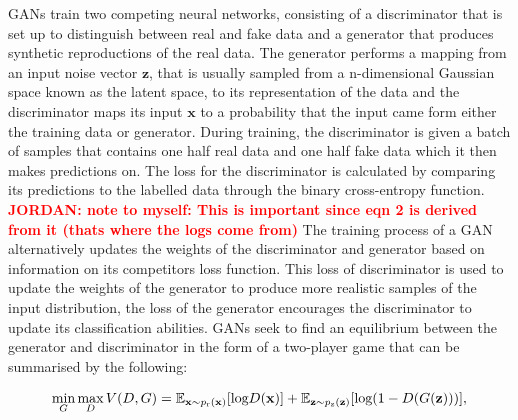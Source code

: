 \documentclass[12pt]{iopart}
\newcommand{\jordan}[1]{\textbf{\textcolor{red}{JORDAN: #1}}}
\newcommand{\chris}[1]{\textbf{\textcolor{green}{CHRIS: #1}}}
\begin{document}
%
\acp{GAN} train two competing neural networks, consisting of a discriminator
that is set up to distinguish between real and fake data and a generator that
produces synthetic reproductions of the real data. The generator performs a
mapping from an input noise vector $\mathbf{z}$, that is usually sampled from a n-dimensional Gaussian space known as the latent space, to its representation of the
data and the discriminator maps its input $\mathbf{x}$ to a probability that
the input came form either the training data or generator.  During training,
the discriminator is given a batch of samples that contains one half real data
and one half fake data which it then makes predictions on. The loss for the
discriminator is calculated by comparing its predictions to the labelled data
through the binary cross-entropy function. \jordan{note to myself: This is important since eqn 2 is derived from it (thats where the logs come from)} The training process of a \ac{GAN}
alternatively updates the weights of the discriminator and generator based on
information on its competitors loss function. This loss of discriminator is
used to update the weights of the generator to produce more realistic samples
of the input distribution, the loss of the generator encourages the
discriminator to update its classification abilities. GANs seek to find an equilibrium between the generator and discriminator in the form of a two-player game that can be summarised by the following:  

%
\begin{equation}
  \mathop{\text{min}}_{G}  \mathop{\text{max}}_{D} V(D,G) = \mathbb{E}_{\mathbf{x} \sim p_{\text{r}}(\mathbf{x})} [\text{log} D(\mathbf{x})] \\ + \mathbb{E}_{\mathbf{z} \sim p_{\text{z}}(\mathbf{z})} [\text{log}(1-D(G(\mathbf{z})))],
\label{equation:GANloss}
\end{equation}
\end{document}
